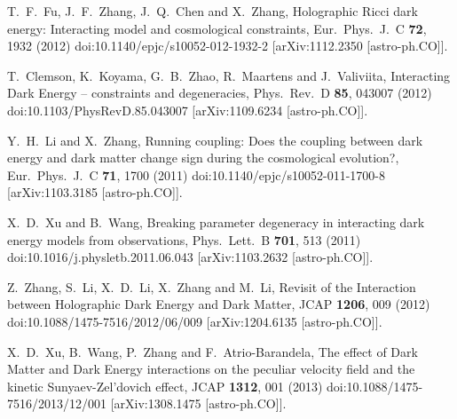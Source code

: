 \documentclass[aps,prd,nofootinbib,amsmath,amssymb,superscriptaddress,twocolumn,10pt]{revtex4}%
\begin{document}
\begin{thebibliography}{99}
  T.~F.~Fu, J.~F.~Zhang, J.~Q.~Chen and X.~Zhang,
  Holographic Ricci dark energy: Interacting model and cosmological constraints,
  Eur.\ Phys.\ J.\ C {\bf 72}, 1932 (2012)
  doi:10.1140/epjc/s10052-012-1932-2
  [arXiv:1112.2350 [astro-ph.CO]].

  T.~Clemson, K.~Koyama, G.~B.~Zhao, R.~Maartens and J.~Valiviita,
  Interacting Dark Energy -- constraints and degeneracies,
  Phys.\ Rev.\ D {\bf 85}, 043007 (2012)
  doi:10.1103/PhysRevD.85.043007
  [arXiv:1109.6234 [astro-ph.CO]].

  Y.~H.~Li and X.~Zhang,
  Running coupling: Does the coupling between dark energy and dark matter change sign during the cosmological evolution?,
  Eur.\ Phys.\ J.\ C {\bf 71}, 1700 (2011)
  doi:10.1140/epjc/s10052-011-1700-8
  [arXiv:1103.3185 [astro-ph.CO]].

  X.~D.~Xu and B.~Wang,
  Breaking parameter degeneracy in interacting dark energy models from observations,
  Phys.\ Lett.\ B {\bf 701}, 513 (2011)
  doi:10.1016/j.physletb.2011.06.043
  [arXiv:1103.2632 [astro-ph.CO]].

  Z.~Zhang, S.~Li, X.~D.~Li, X.~Zhang and M.~Li,
  Revisit of the Interaction between Holographic Dark Energy and Dark Matter,
  JCAP {\bf 1206}, 009 (2012)
  doi:10.1088/1475-7516/2012/06/009
  [arXiv:1204.6135 [astro-ph.CO]].

  X.~D.~Xu, B.~Wang, P.~Zhang and F.~Atrio-Barandela,
  The effect of Dark Matter and Dark Energy interactions on the peculiar velocity field and the kinetic Sunyaev-Zel'dovich effect,
  JCAP {\bf 1312}, 001 (2013)
  doi:10.1088/1475-7516/2013/12/001
  [arXiv:1308.1475 [astro-ph.CO]].


\end{thebibliography}
\end{document}
